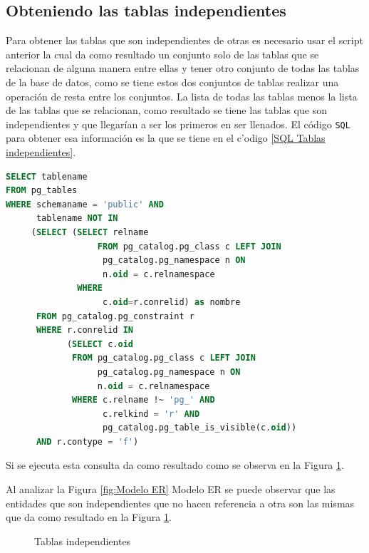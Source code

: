 \subsection{Obteniendo las tablas independientes}
Para obtener las tablas que son independientes de otras es necesario usar el script anterior la cual da como resultado un conjunto solo de las tablas que se relacionan de alguna manera entre ellas y tener otro conjunto de todas las tablas de la base de datos, como se tiene estos dos conjuntos de tablas realizar una operaci\'on de resta entre los conjuntos. La lista de todas las tablas menos la lista de las tablas que se relacionan, como resultado se tiene las tablas que son independientes y que llegar\'ian a ser los primeros en ser llenados.
El c\'odigo \texttt{SQL} para obtener esa informaci\'on es la que se tiene en el c'odigo \ref{SQL Tablas independientes}.
\begin{lstlisting}[caption={Query para obtener tablas independientes},label={SQL Tablas independientes},language=sql]
SELECT tablename
FROM pg_tables
WHERE schemaname = 'public' AND
      tablename NOT IN
     (SELECT (SELECT relname 
      		      FROM pg_catalog.pg_class c LEFT JOIN
                   pg_catalog.pg_namespace n ON 
                   n.oid = c.relnamespace 
              WHERE
                   c.oid=r.conrelid) as nombre
      FROM pg_catalog.pg_constraint r 
      WHERE r.conrelid IN
            (SELECT c.oid
             FROM pg_catalog.pg_class c LEFT JOIN
                  pg_catalog.pg_namespace n ON 
                  n.oid = c.relnamespace 
             WHERE c.relname !~ 'pg_' AND 
                   c.relkind = 'r' AND 
                   pg_catalog.pg_table_is_visible(c.oid))
      AND r.contype = 'f')
\end{lstlisting}
Si se ejecuta esta consulta da como resultado como se observa en la Figura \ref{fig:Tablas independientes}.

Al analizar la Figura \ref{fig:Modelo ER} Modelo ER se puede observar que las entidades que son independientes que no hacen referencia a otra son las mismas que da como resultado en la Figura \ref{fig:Tablas independientes}.
\begin{figure}[H]
\centering
{}
\caption{Tablas independientes} \label{fig:Tablas independientes}
\end{figure}
